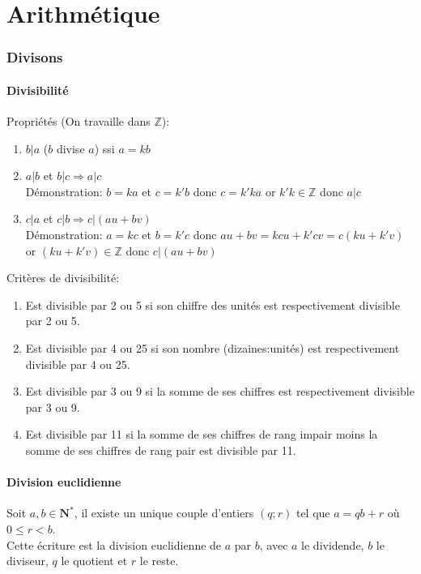 \documentclass{article}
\begin{document}
\part{Arithmétique}
\setcounter{section}{0}
\renewcommand*{\theHsection}{chX.\the\value{section}}


\section{Divisons}

\subsection{Divisibilité}
Propriétés (On travaille dans $\mathbb{Z}$):
\begin{enumerate}
	\item $b|a$ ($b$ divise $a$) ssi $a=kb$
	\item $a|b$ et $b|c \Rightarrow a|c$\\
	      Démonstration: $b=ka$ et $c=k'b$ donc $c=k'ka$ or $k'k\in\mathbb{Z}$ donc $a|c$
	\item $c|a$ et $c|b \Rightarrow c|(au+bv)$\\
	      Démonstration: $a=kc$ et $b=k'c$ donc $au+bv=kcu+k'cv=c(ku+k'v)$ or $(ku+k'v)\in\mathbb{Z}$ donc $c|(au+bv)$
\end{enumerate}
Critères de divisibilité:
\begin{enumerate}
	\item Est divisible par 2 ou 5 si son chiffre des unités est respectivement divisible par 2 ou 5.
	\item Est divisible par 4 ou 25 si son nombre (dizaines:unités) est respectivement divisible par 4 ou 25.
	\item Est divisible par 3 ou 9 si la somme de ses chiffres est respectivement divisible par 3 ou 9.
	\item Est divisible par 11 si la somme de ses chiffres de rang impair moins la somme de ses chiffres de rang pair est divisible par 11.
\end{enumerate}

\subsection{Division euclidienne}
Soit $a,b\in\mathbf{N^*}$, il existe un unique couple d'entiers $(q;r)$ tel que $a=qb+r$ où $0\le r < b$. \\Cette écriture est la division euclidienne de $a$ par $b$, avec $a$ le dividende, $b$ le diviseur, $q$ le quotient et $r$ le reste.
\end{document}
